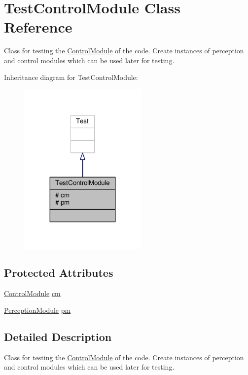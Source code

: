 \hypertarget{class_test_control_module}{}\section{Test\+Control\+Module Class Reference}
\label{class_test_control_module}


Class for testing the \hyperlink{class_control_module}{Control\+Module} of the code. Create instances of perception and control modules which can be used later for testing.  




Inheritance diagram for Test\+Control\+Module\+:
\nopagebreak
\begin{figure}[H]
\begin{center}
\leavevmode
\includegraphics[width=179pt]{class_test_control_module__inherit__graph}
\end{center}
\end{figure}
\subsection*{Protected Attributes}
\begin{DoxyCompactItemize}
\item 
\hyperlink{class_control_module}{Control\+Module} \hyperlink{class_test_control_module_a8b31203bb99dac1486c80c5c270673a3}{cm}
\item 
\hyperlink{class_perception_module}{Perception\+Module} \hyperlink{class_test_control_module_ad498100deff15c962c1d6e933901f7cf}{pm}
\end{DoxyCompactItemize}


\subsection{Detailed Description}
Class for testing the \hyperlink{class_control_module}{Control\+Module} of the code. Create instances of perception and control modules which can be used later for testing. 

